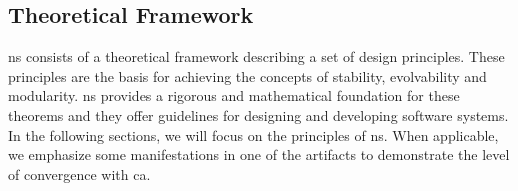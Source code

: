 \subsection{Theoretical Framework} \label{subsec:ns_desing_theorems}

\gls{ns} consists of a theoretical framework describing a set of design principles. These
principles are the basis for achieving the concepts of stability, evolvability and
modularity. \gls{ns} provides a rigorous and mathematical foundation for these theorems
and they offer guidelines for designing and developing software systems. In the following
sections, we will focus on the principles of \gls{ns}. When applicable, we emphasize some
manifestations in one of the artifacts to demonstrate the level of convergence with
\gls{ca}.